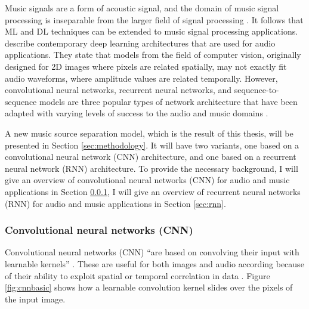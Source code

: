 \documentclass[report.tex]{subfiles}
\begin{document}
Music signals are a form of acoustic signal, and the domain of music signal processing is inseparable from the larger field of signal processing \parencite{musicsp}. It follows that ML and DL techniques can be extended to music signal processing applications. \textcite{audiodeeplearning} describe contemporary deep learning architectures that are used for audio applications. They state that models from the field of computer vision, originally designed for 2D images where pixels are related spatially, may not exactly fit audio waveforms, where amplitude values are related temporally. However, convolutional neural networks, recurrent neural networks, and sequence-to-sequence models are three popular types of network architecture that have been adapted with varying levels of success to the audio and music domains \parencite{audiodeeplearning}.

A new music source separation model, which is the result of this thesis, will be presented in Section \ref{sec:methodology}. It will have two variants, one based on a convolutional neural network (CNN) architecture, and one based on a recurrent neural network (RNN) architecture. To provide the necessary background, I will give an overview of convolutional neural networks (CNN) for audio and music applications in Section \ref{sec:cnn}, I will give an overview of recurrent neural networks (RNN) for audio and music applications in Section \ref{sec:rnn}.

\subsubsection{Convolutional neural networks (CNN)}
\label{sec:cnn}

Convolutional neural networks (CNN) ``are based on convolving their input with learnable kernels'' \parencite[3]{audiodeeplearning}. These are useful for both images and audio according because of their ability to exploit spatial or temporal correlation in data \parencite{cnns}. Figure \ref{fig:cnnbasic} shows how a learnable convolution kernel slides over the pixels of the input image.
\end{document}
